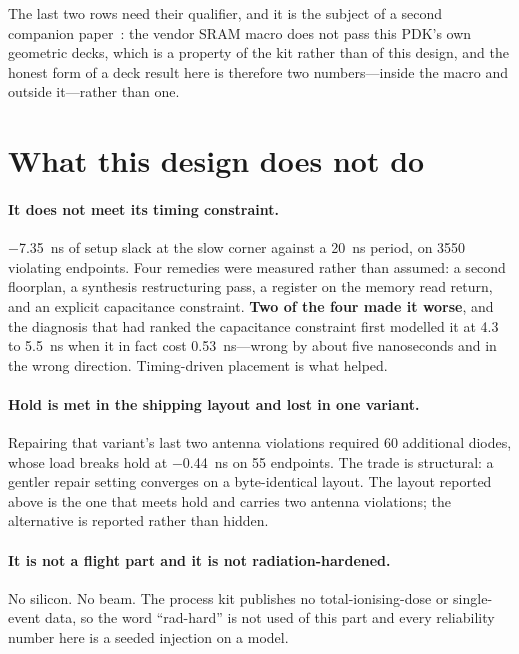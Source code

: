 \documentclass[11pt,a4paper]{article}
\begin{document}
The last two rows need their qualifier, and it is the subject of a
second companion paper~\cite{companion_decks}: the vendor SRAM macro does not pass this PDK's own
geometric decks, which is a property of the kit rather than of this
design, and the honest form of a deck result here is therefore two
numbers---inside the macro and outside it---rather than one.

\section{What this design does not do}
\label{sec:limits}

\paragraph{It does not meet its timing constraint.}
\SI{-7.35}{\nano\second} of setup slack at the slow corner against a
\SI{20}{\nano\second} period, on \num{3550} violating endpoints. Four
remedies were measured rather than assumed: a second floorplan, a
synthesis restructuring pass, a register on the memory read return, and
an explicit capacitance constraint. \textbf{Two of the four made it
worse}, and the diagnosis that had ranked the capacitance constraint
first modelled it at \SI{+4.3}{} to \SI{+5.5}{\nano\second} when it in
fact cost \SI{0.53}{\nano\second}---wrong by about five nanoseconds and
in the wrong direction. Timing-driven placement is what helped.

\paragraph{Hold is met in the shipping layout and lost in one variant.}
Repairing that variant's last two antenna violations required
\num{60} additional diodes, whose load breaks hold at
\SI{-0.44}{\nano\second} on \num{55} endpoints. The trade is structural:
a gentler repair setting converges on a byte-identical layout. The
layout reported above is the one that meets hold and carries two antenna
violations; the alternative is reported rather than hidden.

\paragraph{It is not a flight part and it is not radiation-hardened.}
No silicon. No beam. The process kit publishes no total-ionising-dose or
single-event data, so the word ``rad-hard'' is not used of this part and
every reliability number here is a seeded injection on a model.
\end{document}
